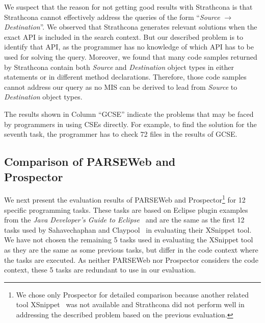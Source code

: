 We suspect that the reason for not getting good results with
Strathcona is that Strathcona cannot effectively address the queries
of the form ``\emph{Source} $\rightarrow$ \emph{Destination}''. We
observed that Strathcona generates relevant solutions when the exact
API is included in the search context.
But our described problem is to identify that API, as
the programmer has no knowledge of which API has to be used for
solving the query. Moreover, we found that many code samples
returned by Strathcona contain both \emph{Source} and
\emph{Destination} object types in either  statements
or in different method declarations. Therefore, those code samples
cannot address our query as no MIS can be derived to lead from
\emph{Source} to \emph{Destination} object types.

The results shown in Column ``GCSE'' indicate the problems that may
be faced by programmers in using CSEs directly. For
example, to find the solution for the seventh task, the programmer
has to check 72 files in the results of GCSE.
\subsection{Comparison of PARSEWeb and \\Prospector}
\label{sec:parseweb_pros}

We next present the evaluation results of PARSEWeb and
Prospector\footnote{We chose only Prospector for detailed comparison
because another related tool XSnippet~\cite{xsnippet:saha} was not
available and Strathcona did not perform well in addressing the
described problem based on the previous evaluation.} for 12 specific
programming tasks. These tasks are based on Eclipse plugin examples
from the \emph{Java Developer's Guide to Eclipse}~\cite{java:eclipse} and are the same as the first 12 tasks
used by Sahavechaphan and Claypool~\cite{xsnippet:saha} in
evaluating their XSnippet tool. We have not chosen the remaining 5
tasks used in evaluating the XSnippet tool as they are the same as
some previous tasks, but differ in the code context where the tasks
are executed. As neither PARSEWeb nor Prospector considers the code
context, these 5 tasks are redundant to use in our evaluation.

